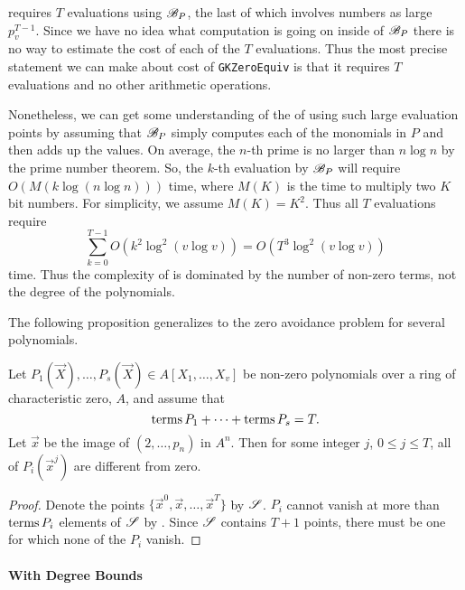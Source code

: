 requires $T$ evaluations using ${\cal B}_P$, the
last of which involves numbers as large $p_v^{T-1}$.  Since we have no
idea what computation is going on inside of ${\cal B}_P$ there is no
way to estimate the cost of each of the $T$ evaluations.  Thus the
most precise statement we can make about cost of {\tt GKZeroEquiv} is
that it requires $T$ evaluations and no other arithmetic operations.

Nonetheless, we can get some understanding of the  
of using such 
large evaluation points by assuming that ${\cal B}_P$ simply
computes each of the monomials in $P$ and then adds up the values.  On
average, the $n$-th prime is no larger than $n \log n$ by the prime
number theorem.  So, the $k$-th evaluation by ${\cal B}_P$ will
require $O\left(M(k \log (n \log n))\right)$ time, where $M(K)$ is the
time to multiply two $K$ bit numbers.  For simplicity, we assume $M(K)
= K^2$.  Thus all $T$ evaluations require
\[
\sum_{k=0}^{T-1} O(k^2 \log^2 (v \log v))  = O(T^{3} \log^2 (v \log v))
\]
time.  Thus the complexity of  is dominated by the 
number of non-zero terms, not the degree of the polynomials.

The following proposition generalizes  to 
the zero avoidance  problem for several polynomials.

\begin{proposition}
\label{Interp:15:Prop}
Let $P_1(\vec{X}), \ldots, P_s(\vec{X}) \in A[X_1, \ldots, X_v]$ be
non-zero polynomials over a ring of characteristic zero, $A$, and
assume that 
\[
\mathop{\rm terms}\nolimits P_1 + \cdots + \mathop{\rm terms}\nolimits P_s = T.
\]
Let $\vec{x}$ be the image of $(2, \ldots, p_n)$ in $A^n$.  Then for some 
integer $j$, $0 \le j \le T$, all of $P_i(\vec{x}^j)$ are different from zero.
\end{proposition}

\begin{proof}
Denote the points $\{ \vec{x}^0, \vec{x}, \ldots, \vec{x}^T\}$ by
${\cal S}$.  $P_i$ cannot vanish at more than $\mathop{\rm terms}\nolimits P_i$ elements of
${\cal S}$ by .  Since ${\cal S}$
contains $T+1$ points, there must be one for which none of the $P_i$
vanish. 
\end{proof}

\paragraph{With Degree Bounds}

